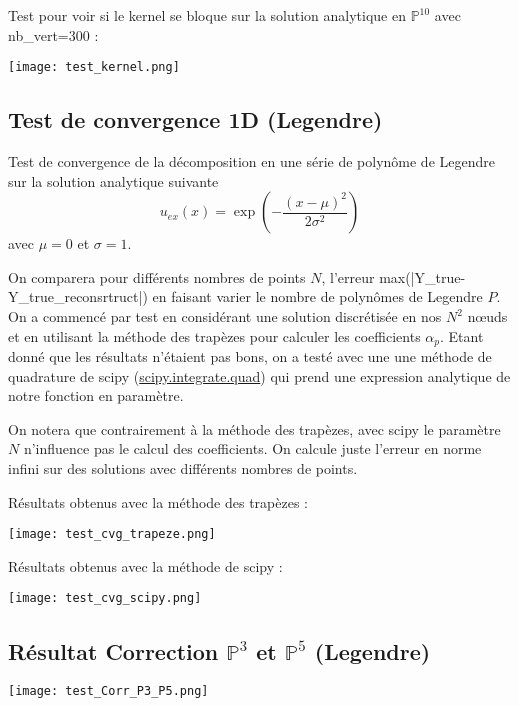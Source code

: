 Test pour voir si le kernel se bloque sur la solution analytique en $\mathbb{P}^{10}$ avec nb\_vert=300 :

\begin{minipage}{\linewidth}
	\centering
	\texttt{[image: test\_kernel.png]}
\end{minipage}

\subsection{Test de convergence 1D (Legendre)}

Test de convergence de la décomposition en une série de polynôme de Legendre sur la solution analytique suivante
$$u_{ex}(x) = \exp\left(-\frac{(x-\mu)^2}{2\sigma^2}\right)$$
avec $\mu=0$ et $\sigma=1$.

On comparera pour différents nombres de points $N$, l'erreur max(|Y\_true-Y\_true\_reconsrtruct|) en faisant varier le nombre de polynômes de Legendre $P$. On a commencé par test en considérant une solution discrétisée en nos $N^2$ nœuds et en utilisant la méthode des trapèzes pour calculer les coefficients $\alpha_p$. Etant donné que les résultats n'étaient pas bons, on a testé avec une une méthode de quadrature de scipy (\href{https://docs.scipy.org/doc/scipy/reference/generated/scipy.integrate.quad.html#scipy.integrate.quad}{scipy.integrate.quad}) qui prend une expression analytique de notre fonction en paramètre.

\begin{Rem}
	On notera que contrairement à la méthode des trapèzes, avec scipy le paramètre $N$ n'influence pas le calcul des coefficients. On calcule juste l'erreur en norme infini sur des solutions avec différents nombres de points.
\end{Rem}

Résultats obtenus avec la méthode des trapèzes :

\begin{minipage}{\linewidth}
	\centering
	\texttt{[image: test\_cvg\_trapeze.png]}
\end{minipage}

Résultats obtenus avec la méthode de scipy :

\begin{minipage}{\linewidth}
	\centering
	\texttt{[image: test\_cvg\_scipy.png]}
\end{minipage}

\subsection{Résultat Correction $\mathbb{P}^3$ et $\mathbb{P}^5$ (Legendre)}

\begin{minipage}{\linewidth}
	\centering
	\texttt{[image: test\_Corr\_P3\_P5.png]}
\end{minipage}